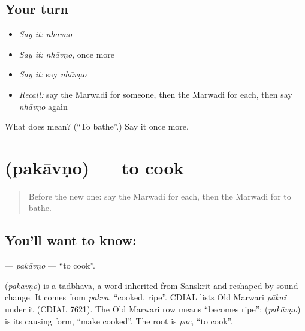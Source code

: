 \subsection*{Your turn}
\begin{itemize}
\raggedright
  \item \emph{Say it:} \emph{nhāvṇo}
  \item \emph{Say it:} \emph{nhāvṇo}, once more
  \item \emph{Say it:} say \emph{nhāvṇo}
  \item \emph{Recall:} say the Marwadi for someone, then the Marwadi for each, then say \emph{nhāvṇo} again
\end{itemize}

\begin{tcolorbox}[breakable,colback=teal!4,colframe=teal!35!black,title={Before you move on}]
What does  mean? (\textquotedblleft{}To bathe\textquotedblright{}.) Say it once more.
\end{tcolorbox}
\section[\texorpdfstring{\mw{पकावणो} (pakāvṇo)}{पकावणो (pakāvṇo)}]{ (pakāvṇo) — to cook}

\label{lesson:MW-C103-pakavno}



\begin{quote}
Before the new one: say the Marwadi for each, then the Marwadi for to bathe.
\end{quote}

\subsection*{You'll want to know: }
\textbf{} — \emph{pakāvṇo} — \textquotedblleft{}to cook\textquotedblright{}.

\begin{cousinweb}
\textbf{} (\emph{pakāvṇo}) is a tadbhava, a word inherited from Sanskrit and reshaped by sound change. It comes from \emph{pakva}, \textquotedblleft{}cooked, ripe\textquotedblright{}. CDIAL lists Old Marwari \emph{pākaï} under it (CDIAL 7621). The Old Marwari row means \textquotedblleft{}becomes ripe\textquotedblright{}; \textbf{} (\emph{pakāvṇo}) is its causing form, \textquotedblleft{}make cooked\textquotedblright{}. The root is \emph{pac}, \textquotedblleft{}to cook\textquotedblright{}.
\end{cousinweb}

